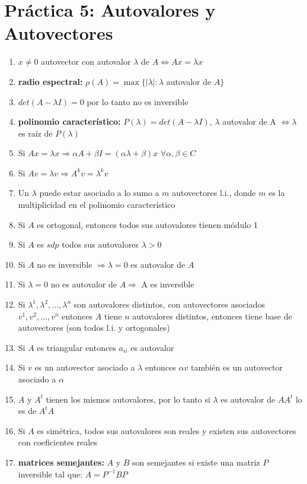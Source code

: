 \documentclass[10pt]{article}
\begin{document}
\section*{Práctica 5: Autovalores y Autovectores}
\begin{enumerate}
    \item $x \neq 0$ autovector con autovalor $\lambda$ de $A \iff Ax = \lambda x$ 
    \item \textbf{radio espectral:} $\rho(A) = \max \{|\lambda| : \lambda$ autovalor de $A\}$
    \item $det(A-\lambda I) = 0$ por lo tanto no es inversible
    \item \textbf{polinomio característico:} $P(\lambda) = det(A-\lambda I)$, $\lambda$ autovalor de A $\iff \lambda$ es raíz de $P(\lambda)$
    \item Si $Ax = \lambda x \Rightarrow \alpha A + \beta I = (\alpha \lambda + \beta) x$ $\forall \alpha,\beta \in C$ 
    \item Si $Av = \lambda v \Rightarrow A^kv = \lambda^k v$
    \item Un $\lambda$ puede estar asociado a lo sumo a $m$ autovectores l.i., donde $m$ es la multiplicidad en el polinomio característico
    \item Si $A$ es ortogonal, entonces todos sus autovalores tienen módulo 1
    \item Si $A$ es $sdp$ todos sus autovalores $\lambda > 0$ 
    \item Si $A$ no es inversible $\Rightarrow \lambda = 0$ es autovalor de $A$
    \item Si $\lambda = 0$ no es autovalor de $A \Rightarrow$ A es inversible
    \item Si $\lambda^1, \lambda^2, \dots, \lambda^n$ son autovalores distintos, con autovectores asociados $v^1, v^2, \dots, v^n$ entonces $A$ tiene $n$ autovalores distintos, entonces tiene base de autovectores (son todos l.i. y ortogonales)
    \item Si $A$ es triangular entonces $a_{ii}$ es autovalor
    \item Si $v$ es un autovector asociado a $\lambda$ entonces $\alpha v$ también es un autovector asociado a $\alpha$
    \item $A$ y $A^t$ tienen los mismos autovalores, por lo tanto si $\lambda$ es autovalor de $AA^t$ lo es de $A^tA$ 
    \item Si $A$ es simétrica, todos sus autovalores son reales y existen sus autovectores con coeficientes reales
    \item \textbf{matrices semejantes:} $A$ y $B$ son semejantes si existe una matriz $P$ inversible tal que: $A = P^{-1}BP$

\end{enumerate}
\end{document}
